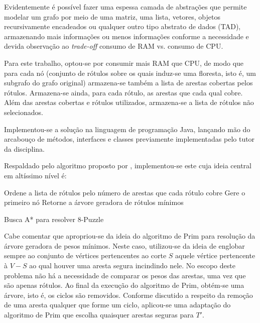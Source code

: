 \documentclass[12pt]{article}
\begin{document}
		Evidentemente é possível fazer uma espessa camada de abstrações que permite modelar um grafo por meio de uma matriz, uma lista, vetores, objetos recursivamente encadeados ou qualquer outro tipo abstrato de dados (TAD), armazenando mais informações ou menos informações conforme a necessidade e devida observação ao \textit{trade-off} consumo de RAM vs. consumo de CPU.

		Para este trabalho, optou-se por consumir mais RAM que CPU, de modo que para cada nó (conjunto de rótulos sobre os quais induz-se uma floresta, isto é, um subgrafo do grafo original) armazena-se também a lista de arestas cobertas pelos rótulos. Armazena-se ainda, para cada rótulo, as arestas que cada qual cobre. Além das arestas cobertas e rótulos utilizados, armazena-se a lista de rótulos não selecionados.

		Implementou-se a solução na linguagem de programação Java, lançando mão do arcabouço de métodos, interfaces e classes previamente implementadas pelo tutor da disciplina.

		Respaldado pelo algoritmo proposto por \cite{chang:1996}, implementou-se este cuja ideia central em altíssimo nível é:

		\begin{algorithm}[H]
			\SetAlgoLined
			Ordene a lista de rótulos pelo número de arestas que cada rótulo cobre\;
			Gere o primeiro nó\;
			Retorne a árvore geradora de rótulos mínimos\;
			\caption{Busca A* para resolver 8-Puzzle}
		\end{algorithm}

		Cabe comentar que apropriou-se da ideia do algoritmo de Prim para resolução da árvore geradora de pesos mínimos. Neste caso, utilizou-se da ideia de englobar sempre ao conjunto de vértices pertencentes ao corte $S$ aquele vértice pertencente à $V - S$ ao qual houver uma aresta segura incindindo nele. No escopo deste problema não há a necessidade de comparar os pesos das arestas, uma vez que são apenas rótulos. Ao final da execução do algoritmo de Prim, obtém-se uma árvore, isto é, os ciclos são removidos. Conforme discutido a respeito da remoção de uma aresta qualquer que forme um ciclo, aplicou-se uma adaptação do algoritmo de Prim que escolha quaisquer arestas seguras para $T'$.
\end{document}
